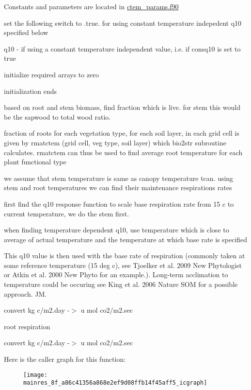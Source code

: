  Constants and parameters are located in \hyperlink{ctem__params_8f90}{ctem\+\_\+params.\+f90}

set the following switch to .true. for using constant temperature indepedent q10 specified below

q10 -\/ if using a constant temperature independent value, i.\+e. if consq10 is set to true





initialize required arrays to zero

initialization ends

based on root and stem biomass, find fraction which is live. for stem this would be the sapwood to total wood ratio.

fraction of roots for each vegetation type, for each soil layer, in each grid cell is given by rmatctem (grid cell, veg type, soil layer) which bio2str subroutine calculates. rmatctem can thus be used to find average root temperature for each plant functional type

we assume that stem temperature is same as canopy temperature tcan. using stem and root temperatures we can find their maintenance respirations rates

first find the q10 response function to scale base respiration rate from 15 c to current temperature, we do the stem first.

when finding temperature dependent q10, use temperature which is close to average of actual temperature and the temperature at which base rate is specified

This q10 value is then used with the base rate of respiration (commonly taken at some reference temperature (15 deg c), see Tjoelker et al. 2009 New Phytologist or Atkin et al. 2000 New Phyto for an example.). Long-\/term acclimation to temperature could be occuring see King et al. 2006 Nature S\+O\+M for a possible approach. J\+M.

convert kg c/m2.\+day -\/$>$ u mol co2/m2.\+sec

root respiration

convert kg c/m2.\+day -\/$>$ u mol co2/m2.\+sec 

Here is the caller graph for this function\+:\nopagebreak
\begin{figure}[H]
\begin{center}
\leavevmode
\texttt{[image: mainres\_8f\_a86c41356a868e2ef9d08ffb14f45aff5\_icgraph]}
\end{center}
\end{figure}



